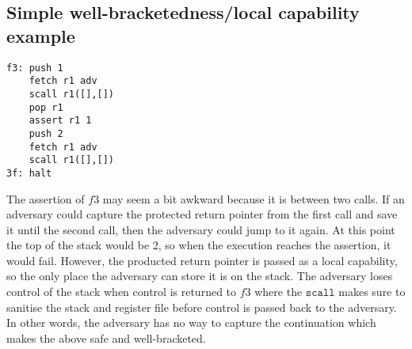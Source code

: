 \documentclass[a4paper]{article}
\begin{document}
\subsection{Simple well-bracketedness/local capability example}
\begin{comment}
\begin{verbatim}
let f = fun adv =>
          let x = 1 in
          adv();
          assert(!x == 1);
          x := 2;
          adv();
          return
\end{verbatim}
              A sensible calling scheme uses local capabilities for the continuation capability passed to the callee. In the above example, if \texttt{adv} can store the continuation, then 
              \texttt{adv} can invoke it during the second call and thus force the assertion to fail. We expect this program to either not terminate or terminate in a failed state (not caused by the assertion) or terminate with the result 0.
            \end{comment}

\begin{verbatim}
f3: push 1
    fetch r1 adv
    scall r1([],[])
    pop r1
    assert r1 1
    push 2
    fetch r1 adv
    scall r1([],[])
3f: halt
\end{verbatim}
The assertion of $f3$ may seem a bit awkward because it is between two calls. If an adversary could capture the protected return pointer from the first call and save it until the second call, then the adversary could jump to it again. At this point the top of the stack would be 2, so when the execution reaches the assertion, it would fail. However, the producted return pointer is passed as a local capability, so the only place the adversary can store it is on the stack. The adversary loses control of the stack when control is returned to $f3$ where the $\mathtt{scall}$ makes sure to sanitise the stack and register file before control is passed back to the adversary. In other words, the adversary has no way to capture the continuation which makes the above safe and well-bracketed.
\end{document}
